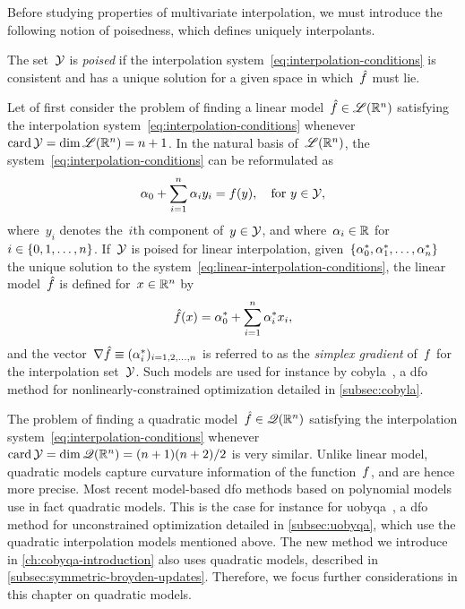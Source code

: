 Before studying properties of multivariate interpolation, we must introduce the following notion of poisedness, which defines uniquely interpolants.

\begin{definition}[Poisedness]
    The set~$\xpt$ is \emph{poised} if the interpolation system~\cref{eq:interpolation-conditions} is consistent and has a unique solution for a given space in which~$\objm$ must lie.
\end{definition}

Let of first consider the problem of finding a linear model~$\objm \in \lpoly$ satisfying the interpolation system~\cref{eq:interpolation-conditions} whenever~$\card \xpt = \dim \lpoly = n + 1$.
In the natural basis of~$\mathscr{L}(\mathbb{R}^n)$, the system~\cref{eq:interpolation-conditions} can be reformulated as
\begin{equation}
    \label{eq:linear-interpolation-conditions}
    \alpha_0 + \sum_{i = 1}^n \alpha_i y_i = \obj(y), \quad \text{for~$y \in \xpt$},
\end{equation}
where~$y_i$ denotes the~$i$th component of~$y \in \xpt$, and where~$\alpha_i \in \mathbb{R}$ for~$i \in \{0, 1, \dots, n\}$.
If~$\xpt$ is poised for linear interpolation, given~$\{\alpha_0^{\ast}, \alpha_1^{\ast}, \dots, \alpha_n^{\ast}\}$ the unique solution to the system~\cref{eq:linear-interpolation-conditions}, the linear model~$\objm$ is defined for~$x \in \mathbb{R}^n$ by
\begin{equation*}
    \objm(x) = \alpha_0^{\ast} + \sum_{i = 1}^n \alpha_i^{\ast} x_i,
\end{equation*}
and the vector~$\nabla \objm \equiv (\alpha_i^{\ast})_{i = 1, 2, \dots, n}$ is referred to as the \emph{simplex gradient} of~$f$ for the interpolation set~$\xpt$.
Such models are used for instance by \gls{cobyla}~\cite{Powell_1994}, a \gls{dfo} method for nonlinearly-constrained optimization detailed in \cref{subsec:cobyla}.

The problem of finding a quadratic model~$\objm \in \qpoly$ satisfying the interpolation system~\cref{eq:interpolation-conditions} whenever~$\card \xpt = \dim \qpoly = (n + 1)(n + 2) / 2$ is very similar.
Unlike linear model, quadratic models capture curvature information of the function~$f$, and are hence more precise.
Most recent model-based \gls{dfo} methods based on polynomial models use in fact quadratic models.
This is the case for instance for \gls{uobyqa}~\cite{Powell_2002}, a \gls{dfo} method for unconstrained optimization detailed in \cref{subsec:uobyqa}, which use the quadratic interpolation models mentioned above.
The new method we introduce in \cref{ch:cobyqa-introduction} also uses quadratic models, described in \cref{subsec:symmetric-broyden-updates}.
Therefore, we focus further considerations in this chapter on quadratic models.

